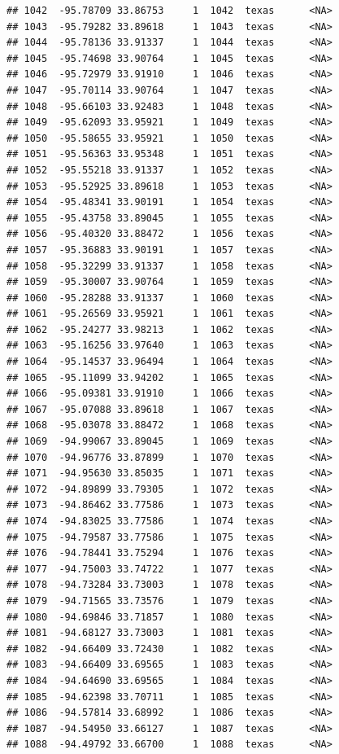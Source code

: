 \documentclass[
]{article}
\begin{document}
\begin{verbatim}
## 1042  -95.78709 33.86753     1  1042  texas      <NA>
## 1043  -95.79282 33.89618     1  1043  texas      <NA>
## 1044  -95.78136 33.91337     1  1044  texas      <NA>
## 1045  -95.74698 33.90764     1  1045  texas      <NA>
## 1046  -95.72979 33.91910     1  1046  texas      <NA>
## 1047  -95.70114 33.90764     1  1047  texas      <NA>
## 1048  -95.66103 33.92483     1  1048  texas      <NA>
## 1049  -95.62093 33.95921     1  1049  texas      <NA>
## 1050  -95.58655 33.95921     1  1050  texas      <NA>
## 1051  -95.56363 33.95348     1  1051  texas      <NA>
## 1052  -95.55218 33.91337     1  1052  texas      <NA>
## 1053  -95.52925 33.89618     1  1053  texas      <NA>
## 1054  -95.48341 33.90191     1  1054  texas      <NA>
## 1055  -95.43758 33.89045     1  1055  texas      <NA>
## 1056  -95.40320 33.88472     1  1056  texas      <NA>
## 1057  -95.36883 33.90191     1  1057  texas      <NA>
## 1058  -95.32299 33.91337     1  1058  texas      <NA>
## 1059  -95.30007 33.90764     1  1059  texas      <NA>
## 1060  -95.28288 33.91337     1  1060  texas      <NA>
## 1061  -95.26569 33.95921     1  1061  texas      <NA>
## 1062  -95.24277 33.98213     1  1062  texas      <NA>
## 1063  -95.16256 33.97640     1  1063  texas      <NA>
## 1064  -95.14537 33.96494     1  1064  texas      <NA>
## 1065  -95.11099 33.94202     1  1065  texas      <NA>
## 1066  -95.09381 33.91910     1  1066  texas      <NA>
## 1067  -95.07088 33.89618     1  1067  texas      <NA>
## 1068  -95.03078 33.88472     1  1068  texas      <NA>
## 1069  -94.99067 33.89045     1  1069  texas      <NA>
## 1070  -94.96776 33.87899     1  1070  texas      <NA>
## 1071  -94.95630 33.85035     1  1071  texas      <NA>
## 1072  -94.89899 33.79305     1  1072  texas      <NA>
## 1073  -94.86462 33.77586     1  1073  texas      <NA>
## 1074  -94.83025 33.77586     1  1074  texas      <NA>
## 1075  -94.79587 33.77586     1  1075  texas      <NA>
## 1076  -94.78441 33.75294     1  1076  texas      <NA>
## 1077  -94.75003 33.74722     1  1077  texas      <NA>
## 1078  -94.73284 33.73003     1  1078  texas      <NA>
## 1079  -94.71565 33.73576     1  1079  texas      <NA>
## 1080  -94.69846 33.71857     1  1080  texas      <NA>
## 1081  -94.68127 33.73003     1  1081  texas      <NA>
## 1082  -94.66409 33.72430     1  1082  texas      <NA>
## 1083  -94.66409 33.69565     1  1083  texas      <NA>
## 1084  -94.64690 33.69565     1  1084  texas      <NA>
## 1085  -94.62398 33.70711     1  1085  texas      <NA>
## 1086  -94.57814 33.68992     1  1086  texas      <NA>
## 1087  -94.54950 33.66127     1  1087  texas      <NA>
## 1088  -94.49792 33.66700     1  1088  texas      <NA>
\end{verbatim}
\end{document}
